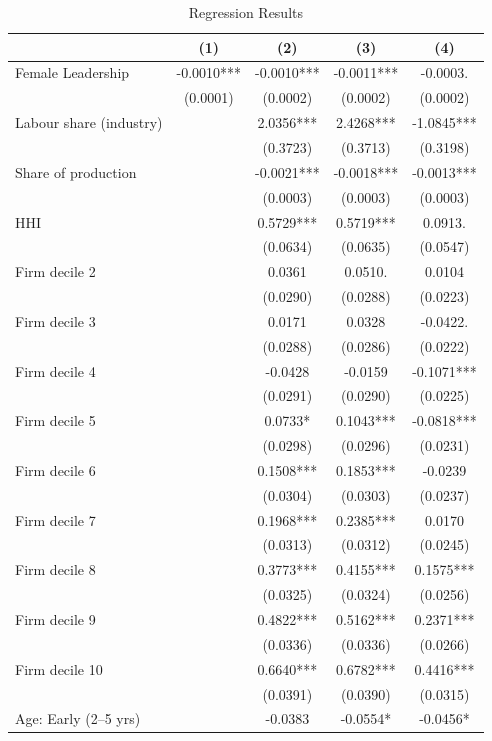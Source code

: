 \begin{table}[htbp]
\centering
\caption{Regression Results}
\label{tab:regression}
\begin{tabular}{lcccc}
\hline\hline
 & (1) & (2) & (3) & (4) \\
\hline
Female Leadership & -0.0010*** & -0.0010*** & -0.0011*** & -0.0003. \\
 & (0.0001) & (0.0002) & (0.0002) & (0.0002) \\
Labour share (industry) &  & 2.0356*** & 2.4268*** & -1.0845*** \\
 &  & (0.3723) & (0.3713) & (0.3198) \\
Share of production &  & -0.0021*** & -0.0018*** & -0.0013*** \\
 &  & (0.0003) & (0.0003) & (0.0003) \\
HHI &  & 0.5729*** & 0.5719*** & 0.0913. \\
 &  & (0.0634) & (0.0635) & (0.0547) \\
Firm decile 2 &  & 0.0361 & 0.0510. & 0.0104 \\
 &  & (0.0290) & (0.0288) & (0.0223) \\
Firm decile 3 &  & 0.0171 & 0.0328 & -0.0422. \\
 &  & (0.0288) & (0.0286) & (0.0222) \\
Firm decile 4 &  & -0.0428 & -0.0159 & -0.1071*** \\
 &  & (0.0291) & (0.0290) & (0.0225) \\
Firm decile 5 &  & 0.0733* & 0.1043*** & -0.0818*** \\
 &  & (0.0298) & (0.0296) & (0.0231) \\
Firm decile 6 &  & 0.1508*** & 0.1853*** & -0.0239 \\
 &  & (0.0304) & (0.0303) & (0.0237) \\
Firm decile 7 &  & 0.1968*** & 0.2385*** & 0.0170 \\
 &  & (0.0313) & (0.0312) & (0.0245) \\
Firm decile 8 &  & 0.3773*** & 0.4155*** & 0.1575*** \\
 &  & (0.0325) & (0.0324) & (0.0256) \\
Firm decile 9 &  & 0.4822*** & 0.5162*** & 0.2371*** \\
 &  & (0.0336) & (0.0336) & (0.0266) \\
Firm decile 10 &  & 0.6640*** & 0.6782*** & 0.4416*** \\
 &  & (0.0391) & (0.0390) & (0.0315) \\
Age: Early (2--5 yrs) &  & -0.0383 & -0.0554* & -0.0456* \\

\end{tabular}
\end{table}
